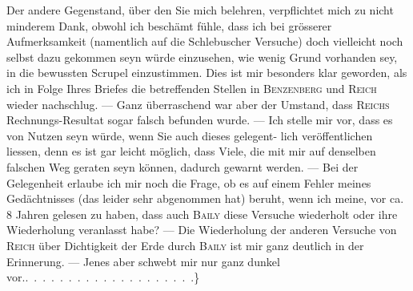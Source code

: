 Der andere Gegenstand, über den Sie mich belehren, verpflichtet mich
zu nicht minderem Dank, obwohl ich beschämt fühle, dass ich bei grösserer
Aufmerksamkeit (namentlich auf die Schlebuscher Versuche) doch vielleicht
noch selbst dazu gekommen seyn würde einzusehen, wie wenig Grund vorhanden
sey, in die bewussten Scrupel einzustimmen. Dies ist mir besonders
klar geworden, als ich in Folge Ihres Briefes die betreffenden Stellen in \textsc{Benzenberg}
und \textsc{Reich} wieder nachschlug. — Ganz überraschend war aber der Umstand,
dass \textsc{Reichs} Rechnungs-Resultat sogar falsch befunden wurde. — Ich
stelle mir vor, dass es von Nutzen seyn würde, wenn Sie auch dieses gelegent-\HistoricalFoot{}{6\textsuperscript{*}}
\clearpage{}
\noindent lich veröffentlichen liessen, denn es ist gar leicht möglich, dass Viele, die mit
mir auf denselben falschen Weg geraten seyn können, dadurch gewarnt werden.
— Bei der Gelegenheit erlaube ich mir noch die Frage, ob es auf einem
Fehler meines Gedächtnisses (das leider sehr abgenommen hat) beruht, wenn
ich meine, vor ca. 8 Jahren gelesen zu haben, dass auch \textsc{Baily} diese Versuche
wiederholt oder ihre Wiederholung veranlasst habe? — Die Wiederholung der
anderen Versuche von \textsc{Reich} über Dichtigkeit der Erde durch \textsc{Baily} ist mir
ganz deutlich in der Erinnerung. — Jenes aber schwebt mir nur ganz dunkel
vor.\quad .\ .\ .\ .\ .\ .\ .\ \hspace{.6em}.\ .\ .\ .\ .\ .\ .\ .\ .\ .\ .\ .\ .\}
\clearpage\endgroup
